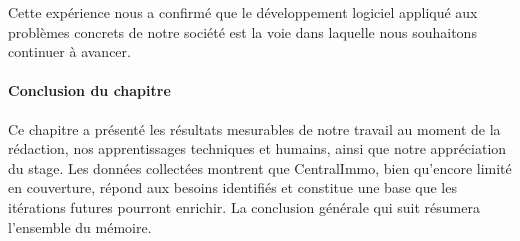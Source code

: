 Cette exp\'erience nous a confirm\'e que le d\'eveloppement logiciel appliqu\'e aux probl\`emes concrets de notre soci\'et\'e est la voie dans laquelle nous souhaitons continuer \`a avancer.

\paragraph*{Conclusion du chapitre}
Ce chapitre a pr\'esent\'e les r\'esultats mesurables de notre travail au moment de la r\'edaction, nos apprentissages techniques et humains, ainsi que notre appr\'eciation du stage. Les donn\'ees collect\'ees montrent que CentralImmo, bien qu'encore limit\'e en couverture, r\'epond aux besoins identifi\'es et constitue une base que les it\'erations futures pourront enrichir. La conclusion g\'en\'erale qui suit r\'esumera l'ensemble du m\'emoire.
